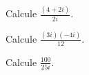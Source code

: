 \begin{ejercicio}
Calcule $\displaystyle \frac{(4+2i)}{2i}$.
\end{ejercicio}

\begin{ejercicio}
Calcule $\displaystyle \frac{(3i)(-4i)}{12}$.
\end{ejercicio}

\begin{ejercicio}
Calcule $\displaystyle \frac{100}{25i}$.
\end{ejercicio}
